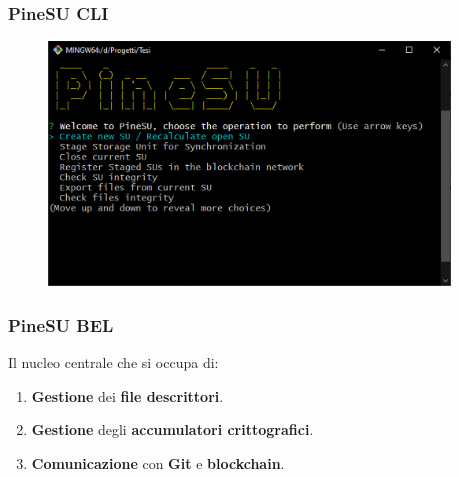 \documentclass{beamer}
\begin{document}
\begin{frame}
	\frametitle{PineSU CLI}
	\centering
	\begin{figure}
		\includegraphics[width=0.95\textwidth]{figures/menu.jpg}
	\end{figure}
\end{frame}

\begin{frame}
	\frametitle{PineSU BEL}
	Il nucleo centrale che si occupa di:
	\begin{enumerate}
		\item \textbf{Gestione} dei \textbf{file descrittori}.
		\item \textbf{Gestione} degli \textbf{accumulatori crittografici}.
		\item \textbf{Comunicazione} con \textbf{Git} e \textbf{blockchain}.
	\end{enumerate}
\end{frame}

\end{document}
